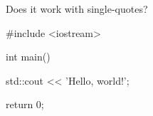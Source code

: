 Does it work with single-quotes?
\begin{console}
#include <iostream>

int main()
{
    std::cout << 'Hello, world!\n';

    return 0;
}
\end{console}
